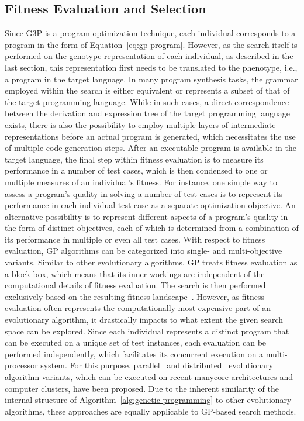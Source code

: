 \subsection{Fitness Evaluation and Selection}
\label{sec:gggp-evaluation-and-selection}
Since G3P is a program optimization technique, each individual corresponds to a program in the form of Equation~\eqref{eq:gp-program}.
However, as the search itself is performed on the genotype representation of each individual, as described in the last section, this representation first needs to be translated to the phenotype, i.e., a program in the target language.
In many program synthesis tasks, the grammar employed within the search is either equivalent or represents a subset of that of the target programming language.
While in such cases, a direct correspondence between the derivation and expression tree of the target programming language exists, there is also the possibility to employ multiple layers of intermediate representations before an actual program is generated, which necessitates the use of multiple code generation steps.
After an executable program is available in the target language, the final step within fitness evaluation is to measure its performance in a number of test cases, which is then condensed to one or multiple measures of an individual's fitness.
For instance, one simple way to assess a program's quality in solving a number of test cases is to represent its performance in each individual test case as a separate optimization objective.
An alternative possibility is to represent different aspects of a program's quality in the form of distinct objectives, each of which is determined from a combination of its performance in multiple or even all test cases.
With respect to fitness evaluation, GP algorithms can be categorized into single- and multi-objective variants.
Similar to other evolutionary algorithms, GP treats fitness evaluation as a block box, which means that its inner workings are independent of the computational details of fitness evaluation.
The search is then performed exclusively based on the resulting fitness landscape~\cite{pitzer2012comprehensive}.
However, as fitness evaluation often represents the computationally most expensive part of an evolutionary algorithm, it drastically impacts to what extent the given search space can be explored.
Since each individual represents a distinct program that can be executed on a unique set of test instances, each evaluation can be performed independently, which facilitates its concurrent execution on a multi-processor system.
For this purpose, parallel~\cite{sudholt2015parallel} and distributed~\cite{gong2015distributed} evolutionary algorithm variants, which can be executed on recent manycore architectures and computer clusters, have been proposed.
Due to the inherent similarity of the internal structure of Algorithm~\ref{alg:genetic-programming} to other evolutionary algorithms, these approaches are equally applicable to GP-based search methods.

